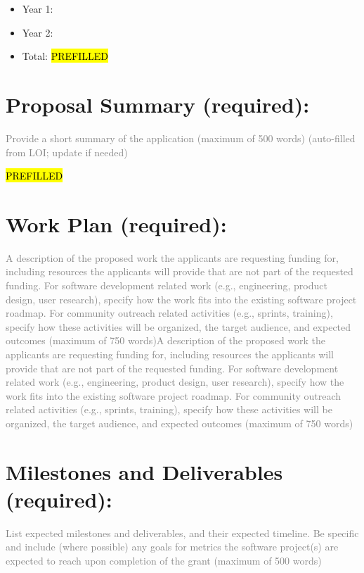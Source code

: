 \begin{itemize}
    \item Year 1:
    \item Year 2:
    \item Total: 
    \hl{PREFILLED}    
\end{itemize}

\section{Proposal Summary (required):}
\textcolor{gray}{Provide a short summary of the application (maximum of 500 words) (auto-filled from LOI; update if needed)}

\hl{PREFILLED}  


\section{Work Plan (required):}
\textcolor{gray}{A description of the proposed work the applicants are requesting funding for, including resources the applicants will provide that are not part of the requested funding. For software development related work (e.g., engineering, product design, user research), specify how the work fits into the existing software project roadmap. For community outreach related activities (e.g., sprints, training), specify how these activities will be organized, the target audience, and expected outcomes (maximum of 750 words)A description of the proposed work the applicants are requesting funding for, including resources the applicants will provide that are not part of the requested funding. For software development related work (e.g., engineering, product design, user research), specify how the work fits into the existing software project roadmap. For community outreach related activities (e.g., sprints, training), specify how these activities will be organized, the target audience, and expected outcomes (maximum of 750 words)}

\section{Milestones and Deliverables (required):}
\textcolor{gray}{List expected milestones and deliverables, and their expected timeline. Be specific and include (where possible) any goals for metrics the software project(s) are expected to reach upon completion of the grant (maximum of 500 words)}

